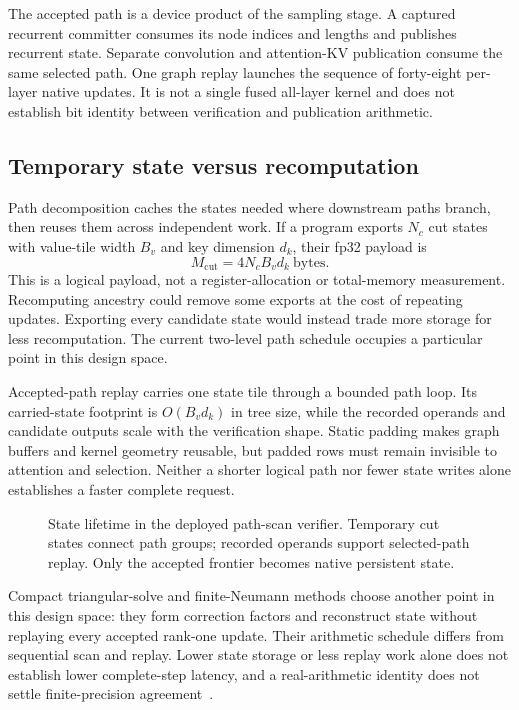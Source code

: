 \documentclass[conference]{IEEEtran}
\begin{document}
The accepted path is a device product of the sampling stage. A captured recurrent committer consumes its node indices and lengths and publishes recurrent state. Separate convolution and attention-KV publication consume the same selected path. One graph replay launches the sequence of forty-eight per-layer native updates. It is not a single fused all-layer kernel and does not establish bit identity between verification and publication arithmetic.

\subsection{Temporary state versus recomputation}
Path decomposition caches the states needed where downstream paths branch, then reuses them across independent work. If a program exports $N_c$ cut states with value-tile width $B_v$ and key dimension $d_k$, their fp32 payload is
\begin{equation}
 M_{\mathrm{cut}}=4N_cB_vd_k\ \text{bytes}.
\end{equation}
This is a logical payload, not a register-allocation or total-memory measurement. Recomputing ancestry could remove some exports at the cost of repeating updates. Exporting every candidate state would instead trade more storage for less recomputation. The current two-level path schedule occupies a particular point in this design space.

Accepted-path replay carries one state tile through a bounded path loop. Its carried-state footprint is $O(B_vd_k)$ in tree size, while the recorded operands and candidate outputs scale with the verification shape. Static padding makes graph buffers and kernel geometry reusable, but padded rows must remain invisible to attention and selection. Neither a shorter logical path nor fewer state writes alone establishes a faster complete request.

\begin{figure}[t]
\centering

\caption{State lifetime in the deployed path-scan verifier. Temporary cut states connect path groups; recorded operands support selected-path replay. Only the accepted frontier becomes native persistent state.}
\label{fig:scan-replay}
\end{figure}

Compact triangular-solve and finite-Neumann methods choose another point in this design space: they form correction factors and reconstruct state without replaying every accepted rank-one update. Their arithmetic schedule differs from sequential scan and replay. Lower state storage or less replay work alone does not establish lower complete-step latency, and a real-arithmetic identity does not settle finite-precision agreement~\cite{ghantasala2026treewy,wang2026bole}.
\end{document}
